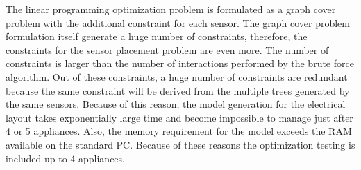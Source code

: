 The linear programming optimization problem is formulated as a graph cover problem with the additional constraint for each sensor. The graph cover problem formulation itself generate a huge number of constraints, therefore, the constraints for the sensor placement problem are even more.  The number of constraints is larger than the number of interactions performed by the brute force algorithm. Out of these constraints, a huge number of constraints are redundant because the same constraint will be derived from the multiple trees generated by the same sensors.  Because of this reason, the model generation for the electrical layout takes exponentially large time and become impossible to manage just after 4 or 5 appliances. Also, the memory requirement for the model exceeds the RAM available on the standard PC.  Because of these reasons the optimization testing is included up to 4 appliances.
